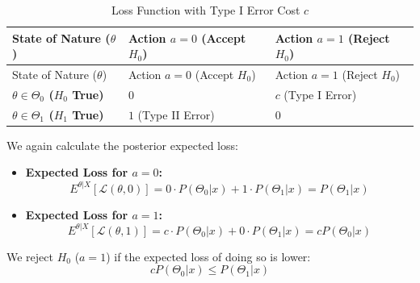 \documentclass[
  letterpaper,
  DIV=11,
  numbers=noendperiod]{scrreprt}
\renewcommand{\[}{\begin{equation}}
\renewcommand{\]}{\end{equation}}
\theoremstyle{definition}
\theoremstyle{plain}
\theoremstyle{plain}
\theoremstyle{plain}
\theoremstyle{definition}
\theoremstyle{plain}
\theoremstyle{remark}
\begin{document}
\begin{longtable}[]{@{}
  >{\raggedright\arraybackslash}p{}
  >{\centering\arraybackslash}p{}
  >{\centering\arraybackslash}p{}@{}}
\caption{Loss Function with Type I Error Cost
\(c\)}\label{tbl-loss-cost}\tabularnewline
\toprule\noalign{}
\begin{minipage}[b]{\linewidth}\raggedright
State of Nature (\(\theta\))
\end{minipage} & \begin{minipage}[b]{\linewidth}\centering
Action \(a=0\) (Accept \(H_0\))
\end{minipage} & \begin{minipage}[b]{\linewidth}\centering
Action \(a=1\) (Reject \(H_0\))
\end{minipage} \\
\midrule\noalign{}
\endfirsthead
\toprule\noalign{}
\begin{minipage}[b]{\linewidth}\raggedright
State of Nature (\(\theta\))
\end{minipage} & \begin{minipage}[b]{\linewidth}\centering
Action \(a=0\) (Accept \(H_0\))
\end{minipage} & \begin{minipage}[b]{\linewidth}\centering
Action \(a=1\) (Reject \(H_0\))
\end{minipage} \\
\midrule\noalign{}
\endhead
\bottomrule\noalign{}
\endlastfoot
\textbf{\(\theta \in \Theta_0\) (\(H_0\) True)} & \(0\) & \(c\) (Type I
Error) \\
\textbf{\(\theta \in \Theta_1\) (\(H_1\) True)} & \(1\) (Type II Error)
& \(0\) \\
\end{longtable}

We again calculate the posterior expected loss:

\begin{itemize}
\item
  \textbf{Expected Loss for \(a=0\):}
  \[E^{\theta|X}[\mathcal{L}(\theta, 0)] = 0 \cdot P(\Theta_0|x) + 1 \cdot P(\Theta_1|x) = P(\Theta_1|x)\]
\item
  \textbf{Expected Loss for \(a=1\):}
  \[E^{\theta|X}[\mathcal{L}(\theta, 1)] = c \cdot P(\Theta_0|x) + 0 \cdot P(\Theta_1|x) = c P(\Theta_0|x)\]
\end{itemize}

We reject \(H_0\) (\(a=1\)) if the expected loss of doing so is lower:
\[
c P(\Theta_0|x) \le P(\Theta_1|x)
\]
\end{document}
